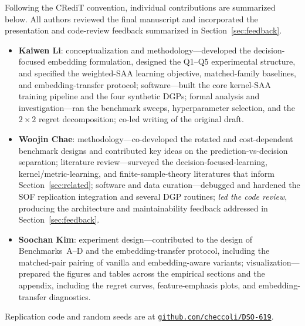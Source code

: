 \documentclass[11pt]{article}
\begin{document}
Following the CRediT convention, individual contributions are summarized below. All authors reviewed the final manuscript and incorporated the presentation and code-review feedback summarized in Section~\ref{sec:feedback}.
\begin{itemize}
    \item \textbf{Kaiwen Li}: conceptualization and methodology---developed the decision-focused embedding formulation, designed the Q1--Q5 experimental structure, and specified the weighted-SAA learning objective, matched-family baselines, and embedding-transfer protocol; software---built the core kernel-SAA training pipeline and the four synthetic DGPs; formal analysis and investigation---ran the benchmark sweeps, hyperparameter selection, and the $2\times 2$ regret decomposition; co-led writing of the original draft.
    \item \textbf{Woojin Chae}: methodology---co-developed the rotated and cost-dependent benchmark designs and contributed key ideas on the prediction-vs-decision separation; literature review---surveyed the decision-focused-learning, kernel/metric-learning, and finite-sample-theory literatures that inform Section~\ref{sec:related}; software and data curation---debugged and hardened the SOF replication integration and several DGP routines; \emph{led the code review}, producing the architecture and maintainability feedback addressed in Section~\ref{sec:feedback}.
    \item \textbf{Soochan Kim}: experiment design---contributed to the design of Benchmarks~A--D and the embedding-transfer protocol, including the matched-pair pairing of vanilla and embedding-aware variants; visualization---prepared the figures and tables across the empirical sections and the appendix, including the regret curves, feature-emphasis plots, and embedding-transfer diagnostics.
\end{itemize}
Replication code and random seeds are at \href{https://github.com/checcoli/DSO-619}{\texttt{github.com/checcoli/DSO-619}}.
\end{document}
